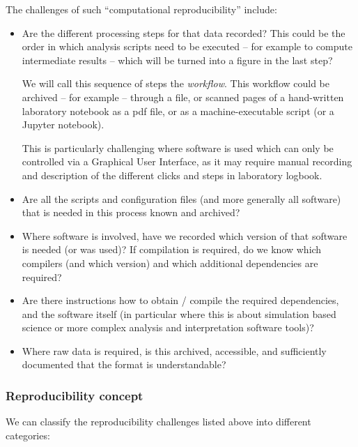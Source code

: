 The challenges of such ``computational reproducibility'' include:
\begin{itemize}
\item Are the different processing steps for that data recorded? This could be
the order in which analysis scripts need to be executed -- for example to
compute intermediate results -- which will be turned into a figure in the last
step?

We will call this sequence of steps the \emph{workflow}. This workflow could be
archived -- for example -- through a  file, or scanned
pages of a hand-written laboratory notebook as a pdf file, or as a
machine-executable script (or a Jupyter notebook).

This is particularly challenging where software is used which can only be
controlled via a Graphical User Interface, as it may require manual recording
and description of the different clicks and steps in laboratory logbook.

\item Are all the scripts and configuration files (and more generally all
software) that is needed in this process known and archived?

\item Where software is involved, have we recorded which version of that
software is needed (or was used)? If compilation is required, do we know which
compilers (and which version) and which additional dependencies are required?

\item Are there instructions how to obtain / compile the required dependencies,
and the software itself (in particular where this is about simulation based
science or more complex analysis and interpretation software tools)?

\item Where raw data is required, is this archived, accessible, and sufficiently
documented that the format is understandable?
\end{itemize}


\subsubsection{Reproducibility concept}\label{sec:reproducibility-concept}

We can classify the reproducibility challenges listed above into different categories:

